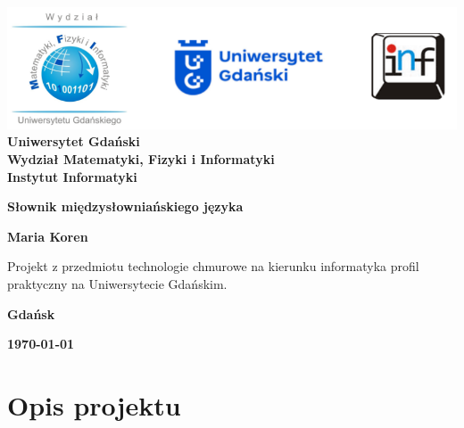 \documentclass[12pt,a4paper]{article}
\newcommand{\hmwkTitle}{Słownik międzysłowniańskiego języka} %
\newcommand{\hmwkDueDate}{\today} %
\newcommand{\hmwkAuthorName}{Maria Koren} %
\begin{document}
\begin{titlepage}
    \vfill
	\begin{center}
	\hspace*{-1cm}
	\vspace*{0.5cm}
    \includegraphics[scale=0.55]{images/loga.png}\\
	\textbf{Uniwersytet Gdański \\ [0.05cm]Wydział Matematyki, Fizyki i Informatyki \\ [0.05cm] Instytut Informatyki}

	\vspace{0.6cm}
	\vspace{4cm}
	{\huge \textbf{\hmwkTitle}}\vspace{8mm}
	
	{\large \textbf{\hmwkAuthorName}}\\[3cm]
	
		\hspace{.45\textwidth} %
	   \begin{minipage}{.5\textwidth}
	   Projekt z przedmiotu technologie chmurowe na kierunku informatyka profil praktyczny na Uniwersytecie Gdańskim.\\[0.1cm]
	  \end{minipage}
	  \vfill
	
	\textbf{Gdańsk}
	
	\textbf{\hmwkDueDate}
	\end{center}
	
\end{titlepage}

\newpage
\setcounter{secnumdepth}{5}
\tableofcontents
\newpage

\section{Opis projektu}
\label{sec:Project}

\end{document}
